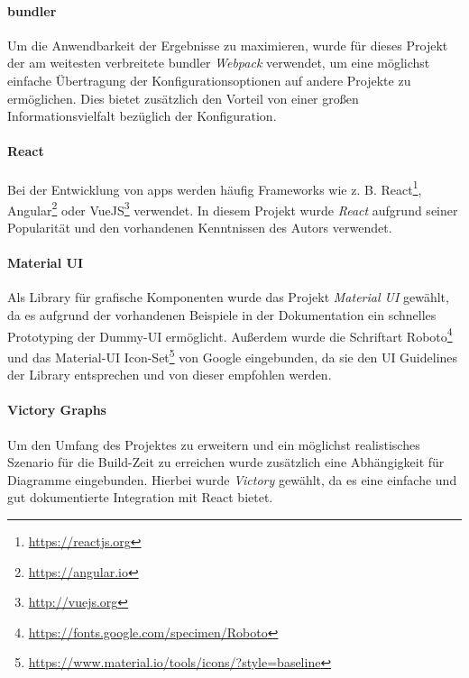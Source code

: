 \documentclass[11pt]{report}
\begin{document}
			\paragraph{\Gls{bundler}} Um die Anwendbarkeit der Ergebnisse zu maximieren, wurde für dieses Projekt der am weitesten verbreitete \Gls{bundler} \emph{Webpack}\cite{npmtrends:wab} verwendet, um eine möglichst einfache Übertragung der Konfigurationsoptionen auf andere Projekte zu ermöglichen. Dies bietet zusätzlich den Vorteil von einer großen Informationsvielfalt bezüglich der Konfiguration.

			\paragraph{React} Bei der Entwicklung von \Glspl{app} werden häufig Frameworks wie z. B. React\footnote{\url{https://reactjs.org}}, Angular\footnote{\url{https://angular.io}} oder VueJS\footnote{\url{http://vuejs.org}} verwendet. In diesem Projekt wurde \emph{React} aufgrund seiner Popularität\cite{npmtrends:frameworks} und den vorhandenen Kenntnissen des Autors verwendet.

			\paragraph{Material UI} Als Library für grafische Komponenten wurde das Projekt \emph{Material UI}\cite{frameworks:material-ui} gewählt, da es aufgrund der vorhandenen Beispiele in der Dokumentation ein schnelles Prototyping der Dummy-UI ermöglicht. Außerdem wurde die Schriftart Roboto\footnote{\url{https://fonts.google.com/specimen/Roboto}} und das Material-UI Icon-Set\footnote{\url{https://www.material.io/tools/icons/?style=baseline}} von Google eingebunden, da sie den UI Guidelines\cite{guidelines:material-ui} der Library entsprechen und von dieser empfohlen werden.

			\paragraph{Victory Graphs} Um den Umfang des Projektes zu erweitern und ein möglichst realistisches Szenario für die Build-Zeit zu erreichen wurde zusätzlich eine Abhängigkeit für Diagramme eingebunden. Hierbei wurde \emph{Victory}\cite{frameworks:victory} gewählt, da es eine einfache und gut dokumentierte Integration mit React bietet.
\end{document}
